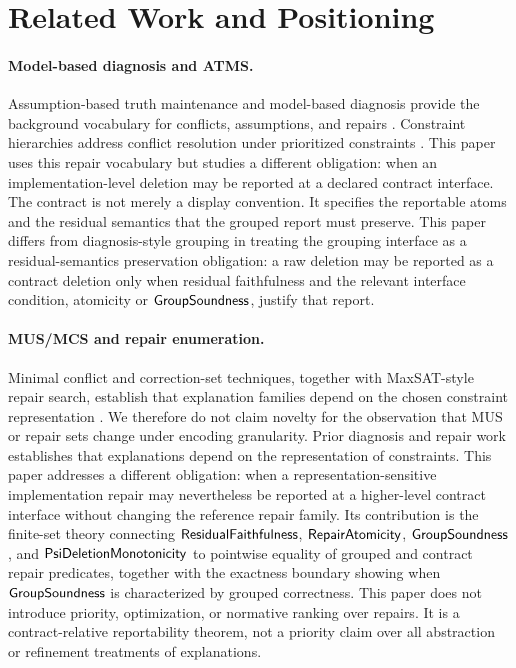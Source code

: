 \section{Related Work and Positioning}
\label{sec:related}

\paragraph{Model-based diagnosis and ATMS.}
Assumption-based truth maintenance and model-based diagnosis provide the
background vocabulary for conflicts, assumptions, and repairs
\citep{dekleer1986atms,reiter1987}.  Constraint hierarchies address conflict
resolution under prioritized constraints \citep{borning1992constraint}.
This paper uses this repair vocabulary but studies a different obligation: when an
implementation-level deletion may be reported at a declared contract interface.
The contract is not merely a display convention.  It specifies the reportable
atoms and the residual semantics that the grouped report must preserve.  This
paper differs from diagnosis-style grouping in treating the grouping interface as a
residual-semantics preservation obligation: a raw deletion may be reported as a
contract deletion only when residual faithfulness and the relevant interface
condition, atomicity or \(\mathsf{GroupSoundness}\), justify that report.

\paragraph{MUS/MCS and repair enumeration.}
Minimal conflict and correction-set techniques, together with MaxSAT-style
repair search, establish that explanation families depend on the chosen
constraint representation \citep{li2009maxsat}.  We therefore do not claim
novelty for the observation that MUS or repair sets change under encoding
granularity.  Prior diagnosis and repair work establishes that explanations
depend on the representation of constraints.  This paper addresses a different
obligation: when a representation-sensitive implementation repair may
nevertheless be reported at a higher-level contract interface without changing
the reference repair family.  Its contribution is the finite-set theory
connecting \(\mathsf{ResidualFaithfulness}\), \(\mathsf{RepairAtomicity}\),
\(\mathsf{GroupSoundness}\), and \(\mathsf{PsiDeletionMonotonicity}\) to pointwise equality of
grouped and contract repair predicates, together with the exactness boundary
showing when \(\mathsf{GroupSoundness}\) is characterized by grouped correctness.  This
paper does not introduce priority, optimization, or normative ranking over repairs.
It is a contract-relative reportability theorem, not a priority claim over all
abstraction or refinement treatments of explanations.

